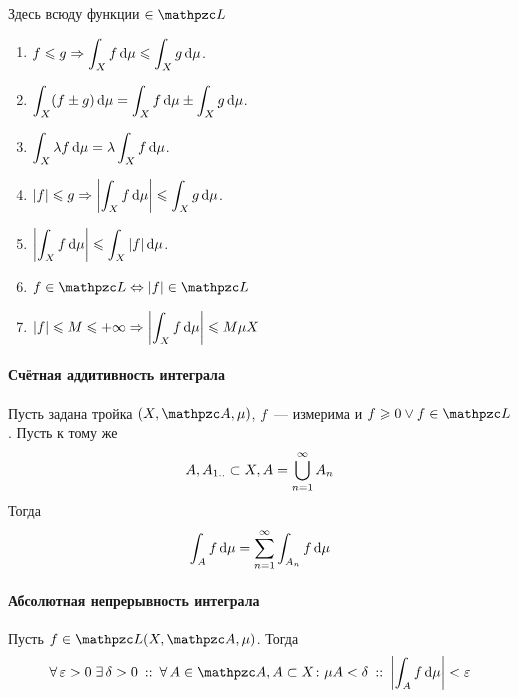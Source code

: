 \documentclass[draft, timbord]{longnotes}
\begin{document}
Здесь всюду функции $\in \summb$
\begin{enumerate}
  \item $\displaystyle
    f \leqslant g \Rightarrow \int_X f \, \mathrm{d} \mu \leqslant \int_X g \, \mathrm{d} \mu$.
  
  \item $\displaystyle
    \int_X (f \pm g)\, \mathrm{d} \mu =  \int_X f \, \mathrm{d} \mu \pm \int_X g \, \mathrm{d} \mu$.

  \item $\displaystyle
    \int_X \lambda f \, \mathrm{d} \mu =  \lambda \int_X f \, \mathrm{d} \mu$.
  
  \item $\displaystyle
    |f| \leqslant g  \Rightarrow \left| \int_X f \, \mathrm{d}\mu \right|\leqslant \int_X g \, \mathrm{d} \mu$.

  \item $\displaystyle
    \left| \int_X f \, \mathrm{d} \mu \right| \leqslant \int_X |f| \, \mathrm{d} \mu$.
  
  \item $\displaystyle
    f \in \summb \Leftrightarrow |f| \in \summb$

  \item $\displaystyle
    |f| \leqslant M \leqslant +\infty 
    \Rightarrow \left| \int_X f \, \mathrm{d}\mu \right| \leqslant M \mu X$
\end{enumerate}

\paragraph{Счётная аддитивность интеграла}
\begin{thrm}\label{thrm:meas::infadd}
  Пусть задана тройка $(X,\alg,\mu)$, $f$~--- измерима и $f \geqslant 0 \lor f \in \summb$. 
  Пусть к тому же 
  \[
    A, A_{1\intrng} \subset X, A = \bigcup_{n=1}^\infty A_n
  \]
  Тогда 
  \[
    \int _A f \, \mathrm{d} \mu = \sum_{n=1}^\infty \int _{A_n} f\, \mathrm{d} \mu 
  \]
\end{thrm}

\paragraph{Абсолютная непрерывность интеграла}
\begin{thrm}\label{thrm:meas::abscont}
  Пусть $f\in \summb(X,\alg,\mu)$. Тогда
  \[
    \forall\, \varepsilon > 0 \; \exists\, \delta > 0 \that \forall\, A \in \alg , A \subset X
    \colon \mu A < \delta \holds \left| \int_A f \, \del \mu \right| < \varepsilon 
  \]
\end{thrm}
\end{document}
